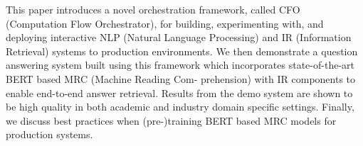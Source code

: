 This paper introduces a novel orchestration framework, called CFO (Computation Flow Orchestrator), for building, experimenting with, and deploying interactive NLP (Natural Language Processing) and IR (Information Retrieval) systems to production environments. We then demonstrate a question answering system built using this framework which incorporates state-of-the-art BERT based MRC (Machine Reading Com- prehension) with IR components to enable end-to-end answer retrieval. Results from the demo system are shown to be high quality in both academic and industry domain specific settings. Finally, we discuss best practices when (pre-)training BERT based MRC models for production systems.
